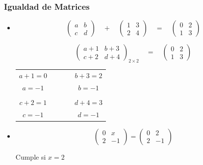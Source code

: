 \documentclass[stu, 12pt, letterpaper, donotrepeattitle, floatsintext, natbib]{apa7}
\begin{document}
\subsubsection{Igualdad de Matrices}
\begin{itemize}
\item \begin{equation*}
\begin{pmatrix}
 a & b \\
 c & d 
\end{pmatrix}
\quad
+
\quad
\begin{pmatrix}
 1 & 3 \\
 2 & 4 
\end{pmatrix}
\quad
=
\quad
\begin{pmatrix}
0 & 2 \\
1 & 3
\end{pmatrix}
\end{equation*}

\begin{equation*}
\begin{pmatrix}
a+1 & b+3 \\
c+2 & d+4
\end{pmatrix}_{2\times 2}
\quad
=
\quad
\begin{pmatrix}
0 & 2 \\
1 & 3
\end{pmatrix}
\end{equation*}

\begin{table}
\centering
\begin{tabular}{ccc}
$a+1=0$ & $\qquad$ & $b+3=2$ \\
$a=-1$ & & $b=-1$ \\
\\
$c+2=1$ & & $d+4=3$ \\
$c=-1$ & & $d=-1$
\end{tabular}
\end{table}


\item \begin{equation*}
\begin{pmatrix}
0 & x \\
2 & -1
\end{pmatrix}
=
\begin{pmatrix}
0 & 2 \\
2 & -1
\end{pmatrix}
\end{equation*}
\begin{center}
Cumple si $x=2$
\end{center}
\end{itemize}
\end{document}

